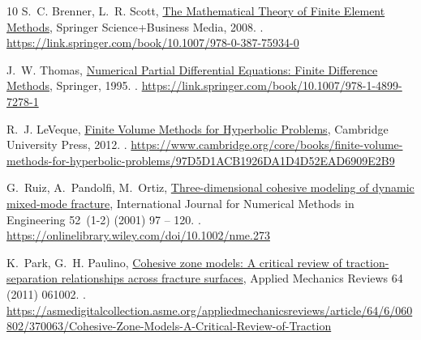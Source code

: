 \documentclass{elsarticle}
\theoremstyle{definition}
\begin{document}
\begin{thebibliography}{10}
S.~C. Brenner, L.~R. Scott,
  \href{https://link.springer.com/book/10.1007/978-0-387-75934-0}{The
  Mathematical Theory of Finite Element Methods}, Springer Science+Business
  Media, 2008.
\newblock \href {https://doi.org/10.1007/978-0-387-75934-0}
  {}.
\newline\urlprefix\url{https://link.springer.com/book/10.1007/978-0-387-75934-0}

J.~W. Thomas,
  \href{https://link.springer.com/book/10.1007/978-1-4899-7278-1}{Numerical
  Partial Differential Equations: Finite Difference Methods}, Springer, 1995.
\newblock \href {https://doi.org/10.1007/978-1-4899-7278-1}
  {}.
\newline\urlprefix\url{https://link.springer.com/book/10.1007/978-1-4899-7278-1}

R.~J. LeVeque,
  \href{https://www.cambridge.org/core/books/finite-volume-methods-for-hyperbolic-problems/97D5D1ACB1926DA1D4D52EAD6909E2B9}{Finite
  Volume Methods for Hyperbolic Problems}, Cambridge University Press, 2012.
\newblock \href {https://doi.org/10.1017/CBO9780511791253}
  {}.
\newline\urlprefix\url{https://www.cambridge.org/core/books/finite-volume-methods-for-hyperbolic-problems/97D5D1ACB1926DA1D4D52EAD6909E2B9}

G.~Ruiz, A.~Pandolfi, M.~Ortiz,
  \href{https://onlinelibrary.wiley.com/doi/10.1002/nme.273}{Three-dimensional
  cohesive modeling of dynamic mixed-mode fracture}, International Journal for
  Numerical Methods in Engineering 52~(1-2) (2001) 97 – 120.
\newblock \href {https://doi.org/10.1002/nme.273} {}.
\newline\urlprefix\url{https://onlinelibrary.wiley.com/doi/10.1002/nme.273}

K.~Park, G.~H. Paulino,
  \href{https://asmedigitalcollection.asme.org/appliedmechanicsreviews/article/64/6/060802/370063/Cohesive-Zone-Models-A-Critical-Review-of-Traction}{Cohesive
  zone models: A critical review of traction-separation relationships across
  fracture surfaces}, Applied Mechanics Reviews 64 (2011) 061002.
\newblock \href {https://doi.org/10.1115/1.4023110}
  {}.
\newline\urlprefix\url{https://asmedigitalcollection.asme.org/appliedmechanicsreviews/article/64/6/060802/370063/Cohesive-Zone-Models-A-Critical-Review-of-Traction}


\end{thebibliography}
\end{document}

